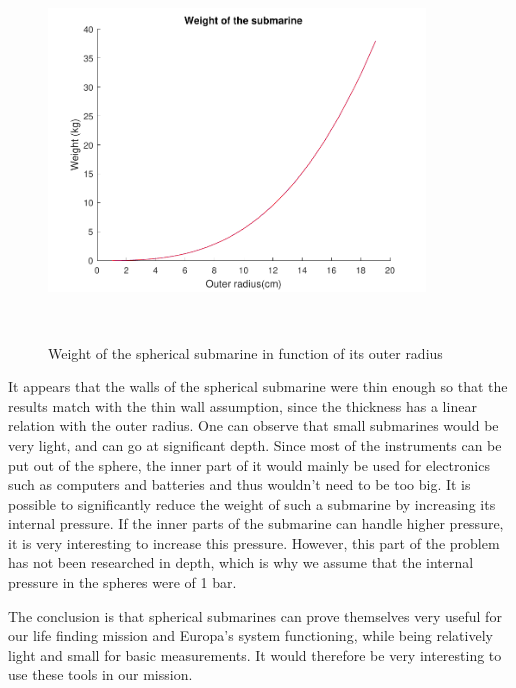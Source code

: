 \begin{figure}[H]
\centering
\includegraphics[width=10cm, height=10cm, clip]{figures/Paul/SphereWeight.pdf}
\caption{Weight of the spherical submarine in function of its outer radius}
\label{sphereweight}
\end{figure}

It appears that the walls of the spherical submarine were thin enough so that the results match with the thin wall assumption, since the thickness has a linear relation with the outer radius.
One can observe that small submarines would be very light, and can go at significant depth. Since most of the instruments can be put out of the sphere, the inner part of it would mainly be used for electronics such as computers and batteries and thus wouldn't need to be too big. It is possible to significantly reduce the weight of such a submarine by increasing its internal pressure. If the inner parts of the submarine can handle higher pressure, it is very interesting to increase this pressure. However, this part of the problem has not been researched in depth, which is why we assume that the internal pressure in the spheres were of 1 bar.

The conclusion is that spherical submarines can prove themselves very useful for our life finding mission and Europa's system functioning, while being relatively light and small for basic measurements. It would therefore be very interesting to use these tools in our mission.
